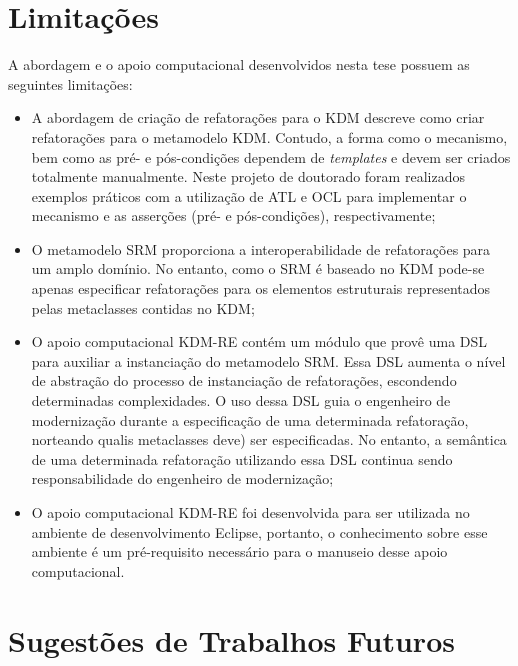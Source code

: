 \section{Limitações}\label{sec:limitacoes_trabalho}

A abordagem e o apoio computacional desenvolvidos nesta tese possuem as seguintes limitações:

\begin{itemize}

\item A abordagem de criação de refatorações para o KDM descreve como criar refatorações para o metamodelo KDM. Contudo, a forma como o mecanismo, bem como as pré- e pós-condições dependem de \textit{templates} e devem ser criados totalmente manualmente. Neste projeto de doutorado foram realizados exemplos práticos com a utilização de ATL e OCL para implementar o mecanismo e as asserções (pré- e pós-condições), respectivamente;

\item O metamodelo SRM proporciona a interoperabilidade de refatorações para um amplo domínio. No entanto, como o SRM é baseado no KDM pode-se apenas especificar refatorações para os elementos estruturais representados pelas metaclasses contidas no KDM;  


\item O apoio computacional KDM-RE contém um módulo que provê uma DSL para auxiliar a instanciação do metamodelo SRM. Essa DSL aumenta o nível de abstração do processo de instanciação de refatorações, escondendo determinadas complexidades. O uso dessa DSL guia o engenheiro de modernização durante a especificação de uma determinada refatoração, norteando qualis metaclasses deve) ser especificadas. No entanto, a semântica de uma determinada refatoração utilizando essa DSL continua sendo responsabilidade do engenheiro de modernização;


\item O apoio computacional KDM-RE foi desenvolvida para ser utilizada no ambiente de desenvolvimento Eclipse, portanto, o conhecimento sobre esse ambiente é um pré-requisito necessário para o manuseio desse apoio computacional.
\end{itemize}

\section{Sugestões de Trabalhos Futuros}\label{sec:trabalhos_futuros_tese}

